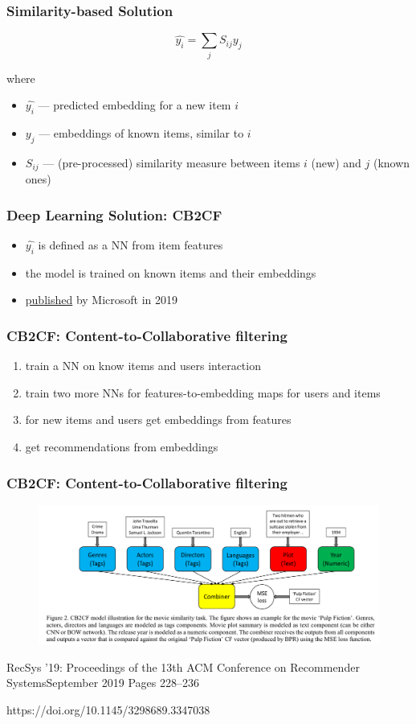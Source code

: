 \documentclass[t]{beamer}
\begin{document}
\begin{frame}
  \frametitle{Similarity-based Solution}
  $$\hat{y_i}=\sum\limits_jS_{ij}y_j$$

  where
  
  \begin{itemize}
  \item $\hat{y_i}$ --- predicted embedding for a new item $i$
  \item $y_j$ --- embeddings of known items, similar to $i$
  \item $S_{ij}$ --- (pre-processed) similarity measure between items $i$ (new) and $j$ (known ones)
  \end{itemize}
\end{frame}  
\begin{frame}
  \frametitle{Deep Learning Solution: CB2CF}
  \begin{itemize}
  \item $\hat{y_i}$ is defined as a NN from item features
  \item the model is trained on known items and their embeddings
  \item \href{https://dl.acm.org/doi/10.1145/3298689.3347038}{published} by Microsoft in 2019  
  \end{itemize}
\end{frame}  
\begin{frame}
  \frametitle{CB2CF: Content-to-Collaborative filtering}
  \begin{enumerate}
  \item train a NN on know items and users interaction
  \item train two more NNs for features-to-embedding maps for users and items
  \item for new items and users get embeddings from features
  \item get recommendations from embeddings  
  \end{enumerate}
\end{frame}  
\begin{frame}
  \frametitle{CB2CF: Content-to-Collaborative filtering}
  \begin{figure}
    \includegraphics[scale=0.25]{CB2CF}
  \end{figure}
  RecSys '19: Proceedings of the 13th ACM Conference on Recommender SystemsSeptember 2019 Pages 228–236

  https://doi.org/10.1145/3298689.3347038
\end{frame}
\end{document}
